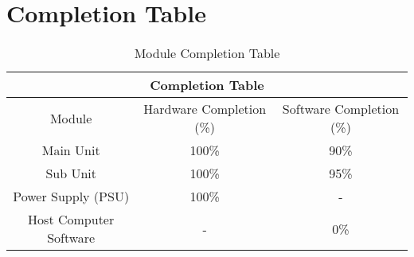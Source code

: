\section{Completion Table}
\begin{table}[h]
 \begin{center}
  \begin{tabular}{|c|c|c|}
    \hline
    \multicolumn{3}{|c|}{Completion Table}\\
    \hline
    Module&Hardware Completion (\%)&Software Completion (\%)\\
    \hline
    Main Unit&100\%&90\%\\
    \hline
    Sub Unit&100\%&95\%\\
    \hline
    Power Supply (PSU)&100\%&-\\
    \hline
    Host Computer Software&-&0\%\\
    \hline
  \end{tabular}
 \end{center}
 \caption{Module Completion Table}
 \label{tab:comp-table}
\end{table}
